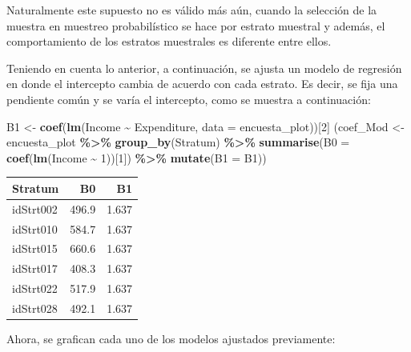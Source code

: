 \documentclass[
  spanish,
  12pt,
]{book}
\newenvironment{Shaded}{\begin{snugshade}}{\end{snugshade}}
\newcommand{\AttributeTok}[1]{\textcolor[rgb]{0.13,0.29,0.53}{#1}}
\newcommand{\DecValTok}[1]{\textcolor[rgb]{0.00,0.00,0.81}{#1}}
\newcommand{\FunctionTok}[1]{\textcolor[rgb]{0.13,0.29,0.53}{\textbf{#1}}}
\newcommand{\NormalTok}[1]{#1}
\newcommand{\OtherTok}[1]{\textcolor[rgb]{0.56,0.35,0.01}{#1}}
\newcommand{\SpecialCharTok}[1]{\textcolor[rgb]{0.81,0.36,0.00}{\textbf{#1}}}
\begin{document}
Naturalmente este supuesto no es válido más aún, cuando la selección de la muestra en muestreo probabilístico se hace por estrato muestral y además, el comportamiento de los estratos muestrales es diferente entre ellos.

Teniendo en cuenta lo anterior, a continuación, se ajusta un modelo de regresión en donde el intercepto cambia de acuerdo con cada estrato. Es decir, se fija una pendiente común y se varía el intercepto, como se muestra a continuación:

\begin{Shaded}
\begin{Highlighting}[]
\NormalTok{B1 }\OtherTok{\textless{}{-}} \FunctionTok{coef}\NormalTok{(}\FunctionTok{lm}\NormalTok{(Income }\SpecialCharTok{\textasciitilde{}}\NormalTok{ Expenditure, }\AttributeTok{data =}\NormalTok{ encuesta\_plot))[}\DecValTok{2}\NormalTok{]}
\NormalTok{(coef\_Mod }\OtherTok{\textless{}{-}}\NormalTok{ encuesta\_plot }\SpecialCharTok{\%\textgreater{}\%} \FunctionTok{group\_by}\NormalTok{(Stratum) }\SpecialCharTok{\%\textgreater{}\%} 
  \FunctionTok{summarise}\NormalTok{(}\AttributeTok{B0 =} \FunctionTok{coef}\NormalTok{(}\FunctionTok{lm}\NormalTok{(Income }\SpecialCharTok{\textasciitilde{}} \DecValTok{1}\NormalTok{))[}\DecValTok{1}\NormalTok{]) }\SpecialCharTok{\%\textgreater{}\%} 
  \FunctionTok{mutate}\NormalTok{(}\AttributeTok{B1 =}\NormalTok{ B1))}
\end{Highlighting}
\end{Shaded}

\begin{tabular}{l|r|r}
\hline
Stratum & B0 & B1\\
\hline
idStrt002 & 496.9 & 1.637\\
\hline
idStrt010 & 584.7 & 1.637\\
\hline
idStrt015 & 660.6 & 1.637\\
\hline
idStrt017 & 408.3 & 1.637\\
\hline
idStrt022 & 517.9 & 1.637\\
\hline
idStrt028 & 492.1 & 1.637\\
\hline
\end{tabular}

Ahora, se grafican cada uno de los modelos ajustados previamente:
\end{document}
